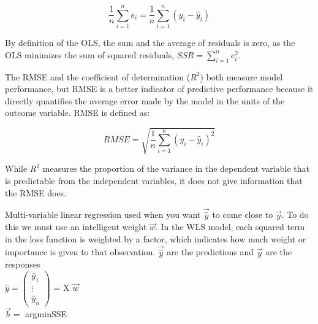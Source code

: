 \documentclass[12pt]{article}
\begin{document}
\begin{enumerate}
\[
\frac{1}{n} \sum_{i=1}^{n} e_i = \frac{1}{n} \sum_{i=1}^{n} (y_i - \hat{y}_i)
\]

By definition of the OLS, the sum and the average of residuals is zero, as the OLS minimizes the sum of squared residuals, \(SSR = \sum_{i=1}^{n} e_i^2\).



The RMSE and the coefficient of determination (\(R^2\)) both measure model performance, but RMSE is a better indicator of predictive performance because it directly quantifies the average error made by the model in the units of the outcome variable. RMSE is defined as:

\[
RMSE = \sqrt{\frac{1}{n} \sum_{i=1}^{n} (y_i - \hat{y}_i)^2}
\]

While \(R^2\) measures the proportion of the variance in the dependent variable that is predictable from the independent variables, it does not give information that the RMSE does.





Multi-variable linear regression used when you want $\vec{\hat{y}}$ to come close to $\vec{y}$. To do this we must use an intelligent weight $\vec{w}$. In the WLS model, each squared term in the loss function is weighted by a factor, which indicates how much weight or importance is given to that observation. $\vec{\hat{y}}$ are the predictions and $\vec{y}$ are the responses\\ 
$\hat{y} = 
\begin{pmatrix}
\hat{y}_1 \\
\vdots \\
\hat{y}_n
\end{pmatrix}$
= X $\vec{w}$ \\ 
$\vec{b} =$ argmin{SSE}


\end{enumerate}
\end{document}
